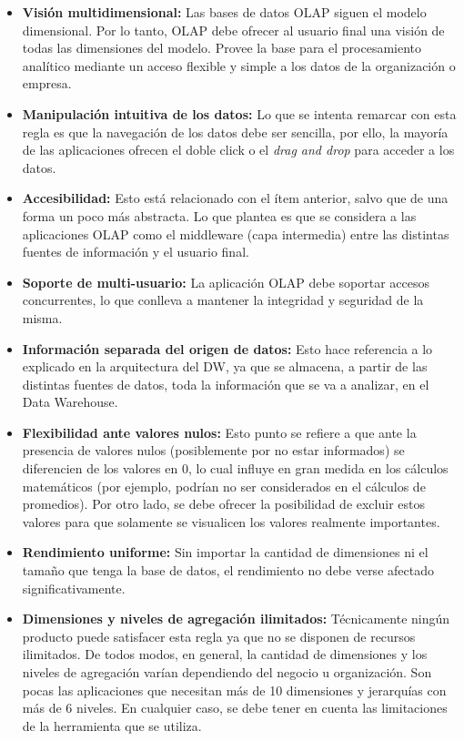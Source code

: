 \documentclass[a4paper,11pt]{article}
\begin{document}
    \begin{itemize}
      \item \textbf{Visión multidimensional:} Las bases de datos OLAP siguen el modelo dimensional. Por lo tanto, OLAP debe ofrecer al usuario final
      una visión de todas las dimensiones del modelo. Provee la base para el procesamiento analítico mediante un acceso flexible y simple a los datos de la 
      organización o empresa.
      \item \textbf{Manipulación intuitiva de los datos:} Lo que se intenta remarcar con esta regla es que la navegación de los datos debe ser
      sencilla, por ello, la mayoría de las aplicaciones ofrecen el doble click o el \textit{drag and drop} para acceder a los datos.
      \item \textbf{Accesibilidad:} Esto está relacionado con el ítem anterior, salvo que de una forma un poco más abstracta. Lo que plantea es que se
      considera a las aplicaciones OLAP como el middleware (capa intermedia) entre las distintas fuentes de información y el usuario final.
      \item \textbf{Soporte de multi-usuario:} La aplicación OLAP debe soportar accesos concurrentes, lo que conlleva a mantener la integridad y seguridad
      de la misma.
      \item \textbf{Información separada del origen de datos:} Esto hace referencia a lo explicado en la arquitectura del DW, ya que se almacena,
      a partir de las distintas fuentes de datos, toda la información que se va a analizar, en el Data Warehouse.
      \item \textbf{Flexibilidad ante valores nulos:} Esto punto se refiere a que ante la presencia de valores nulos (posiblemente por no estar informados)
      se diferencien de los valores en 0, lo cual influye en gran medida en los cálculos matemáticos (por ejemplo, podrían no ser considerados en el cálculos
      de promedios). Por otro lado, se debe ofrecer la posibilidad de excluir estos valores para que solamente se visualicen los valores realmente
      importantes.
      \item \textbf{Rendimiento uniforme:} Sin importar la cantidad de dimensiones ni el tamaño que tenga la base de datos, el rendimiento no debe verse
      afectado significativamente.
      \item \textbf{Dimensiones y niveles de agregación ilimitados:} Técnicamente ningún producto puede satisfacer esta regla ya que no se disponen de
      recursos ilimitados. De todos modos, en general, la cantidad de dimensiones y los niveles de agregación varían dependiendo del negocio u organización.
      Son pocas las aplicaciones que necesitan más de 10 dimensiones y jerarquías con más de 6 niveles.
      En cualquier caso, se debe tener en cuenta las limitaciones de la herramienta que se utiliza.
    \end{itemize}
    
\end{document}
